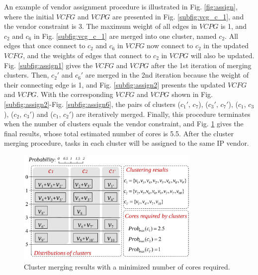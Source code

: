 \documentclass[10pt,journal]{IEEEtran}
\begin{document}
An example of vendor assignment procedure is illustrated in Fig. \ref{fig:assign}, where the initial $VCFG$ and $VCPG$ are presented in Fig. \ref{subfig:vcg_c_1}, and the vendor constraint is 3. The maximum weight of all edges in $VCPG$ is 1, and $c_2$ and $c_6$ in Fig. \ref{subfig:vcg_c_1} are merged into one cluster, named $c_2$. All edges that once connect to $c_2$ and $c_6$ in $VCFG$ now connect to $c_2$ in the updated $VCFG$, and the weights of edges that connect to $c_2$ in $VCPG$ will also be updated. Fig. \ref{subfig:assign1} gives the $VCFG$ and $VCPG$ after the 1st iteration of merging clusters. Then, $c_2'$ and $c_6'$ are merged in the 2nd iteration because the weight of their connecting edge is 1, and Fig. \ref{subfig:assign2} presents the updated $VCFG$ and $VCPG$. With the corresponding $VCFG$ and $VCPG$ shown in Fig. \ref{subfig:assign2}-Fig. \ref{subfig:assign6}, the pairs of clusters ($c_1'$, $c_7$), ($c_3'$, $c_7'$), ($c_1$, $c_3$), ($c_2$, $c_3'$) and ($c_1$, $c_2'$) are iteratively merged. Finally, this procedure terminates when the number of clusters equals the vendor constraint, and Fig. \ref{fig:assign_result} gives the final results, whose total estimated number of cores is 5.5. After the cluster merging procedure, tasks in each cluster will be assigned to the same IP vendor.



\begin{figure}[!t]
\centering
\hspace*{-0.8em}
\includegraphics[width=8.8cm]{figure/vcg_result.pdf}
\caption{Cluster merging results with a minimized number of cores required.}
\label{fig:assign_result}
\end{figure}
\end{document}
